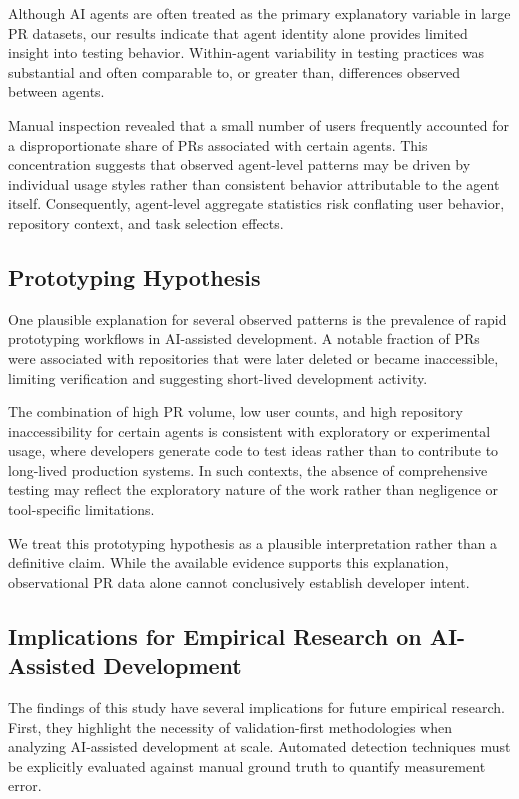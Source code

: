 \documentclass[conference]{IEEEtran}
\begin{document}
Although AI agents are often treated as the primary explanatory variable in large PR datasets, our results indicate that agent identity alone provides limited insight into testing behavior. Within-agent variability in testing practices was substantial and often comparable to, or greater than, differences observed between agents.

Manual inspection revealed that a small number of users frequently accounted for a disproportionate share of PRs associated with certain agents. This concentration suggests that observed agent-level patterns may be driven by individual usage styles rather than consistent behavior attributable to the agent itself. Consequently, agent-level aggregate statistics risk conflating user behavior, repository context, and task selection effects.

\subsection{Prototyping Hypothesis}

One plausible explanation for several observed patterns is the prevalence of rapid prototyping workflows in AI-assisted development. A notable fraction of PRs were associated with repositories that were later deleted or became inaccessible, limiting verification and suggesting short-lived development activity.

The combination of high PR volume, low user counts, and high repository inaccessibility for certain agents is consistent with exploratory or experimental usage, where developers generate code to test ideas rather than to contribute to long-lived production systems. In such contexts, the absence of comprehensive testing may reflect the exploratory nature of the work rather than negligence or tool-specific limitations.

We treat this prototyping hypothesis as a plausible interpretation rather than a definitive claim. While the available evidence supports this explanation, observational PR data alone cannot conclusively establish developer intent.

\subsection{Implications for Empirical Research on AI-Assisted Development}

The findings of this study have several implications for future empirical research. First, they highlight the necessity of validation-first methodologies when analyzing AI-assisted development at scale. Automated detection techniques must be explicitly evaluated against manual ground truth to quantify measurement error.
\end{document}
